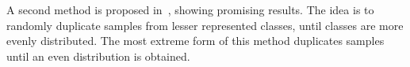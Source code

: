 A second method is proposed in~\cite{balanced-classes}, showing promising results. The idea is to randomly duplicate samples from lesser represented classes, until classes are more evenly distributed. The most extreme form of this method duplicates samples until an even distribution is obtained.





































